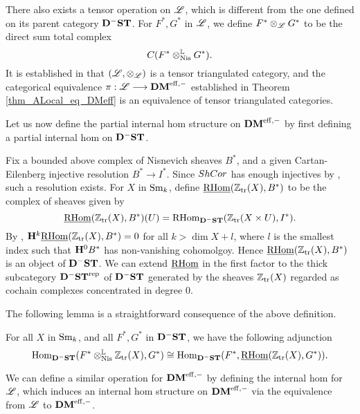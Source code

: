 There also exists a tensor operation on $\ALocal$, which is different
from the one defined on its parent category $\DShCor$.  For $F^*, G^*$
in $\ALocal$, we define $F^* \tAL G^*$ to be the direct sum total 
complex 
\[
\suslC[]( F^* \tLNis G^* ).
\]
It is established in \cite[14.11]{MVW} that $(\ALocal, \tAL)$ is a
tensor triangulated category, and the categorical equivalence
$\pi: \ALocal \to \DMeff$ established in Theorem 
\ref{thm_ALocal_eq_DMeff} is an equivalence of tensor
triangulated categories.

Let us now define the partial internal hom structure on $\DMeff$
by first defining a partial internal hom on $\DShCor$.

\begin{defn}
Fix a bounded above complex of Nisnevich sheaves $B^*$, and a
given Cartan-Eilenberg injective resolution $B^*
\to I^*$. Since $\ShCor$ has enough injectives by 
\cite[6.19]{MVW}, such a resolution exists. For $X$ in $\Sm$, 
define $\sheaf{\rhom}(\Ztr(X), B^*)$ to be the complex of sheaves given by
\[
\sheaf{\rhom}(\Ztr(X), B^*)(U) = \rhom_{\DShCor}(\Ztr(X \times U),
I^*).
\]
By \cite[3.2.9]{TriCa}, $\HH^k \sheaf{\rhom}(\Ztr(X), B^*) = 0$ for
all $k > \dim X + l$, where $l$ is the smallest index such that
$\HH^0B^*$ has non-vanishing cohomolgoy. Hence $\sheaf{\rhom}(\Ztr(X),
B^*)$ is an object of $\DShCor$. We can extend $\sheaf{\rhom}$ in the
first factor to the thick subcategory $\DShCor^{\compact}$ of 
$\DShCor$ generated by the sheaves $\Ztr(X)$ regarded as
cochain complexes concentrated in degree 0.
\end{defn}

The following lemma is a straightforward consequence of the above 
definition.

\begin{lem}\label{lem_ihom_tL_adjunction}
For all $X$ in $\Sm$, and all $F^*, G^*$ in $\DShCor$, we 
have the following adjunction
\[
\hom_{\DShCor}(F^*\tLNis \Ztr(X), G^*) \cong
\hom_{\DShCor}(F^*, \sheaf{\rhom}(\Ztr(X), G^*)).
\]
\end{lem}

We can define a similar operation for $\DMeff$ by
defining the internal hom for $\ALocal$, which induces an internal
hom structure on $\DMeff$ via the equivalence from $\ALocal$ to
$\DMeff$.

